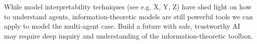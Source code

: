 \documentclass[11pt]{article}
\begin{document}

While model interpretability techniques (see e.g. X, Y, Z) have shed light on how to understand agents, information-theoretic models are still powerful tools we can apply to model the multi-agent case.  Build a future with safe, trustworthy AI may require deep inquiry and understanding of the information-theoretic toolbox.


\nocite{*}

\end{document}
